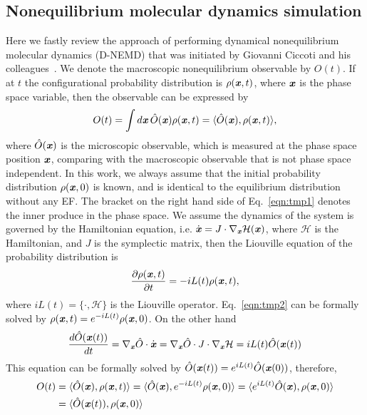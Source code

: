 \documentclass[a4paper,preprint,unsortedaddress,onecolumn]{revtex4-1}
\newcommand{\vect}[1]{\textbf{\textit{#1}}}
\begin{document}
\subsection{Nonequilibrium molecular dynamics simulation}
Here we fastly review the approach of performing dynamical nonequilibrium
molecular dynamics (D-NEMD) that was initiated by Giovanni Ciccoti and his
colleagues~\cite{ciccotti1975direct, ciccotti1979thought,
  orlandini2011hydrodynamics, orlandini2011hydrodynamics-01}.
We denote the macroscopic nonequilibrium observable by $O(t)$. If at $t$
the configurational probability distribution is $\rho(\vect x, t)$, where
$\vect x$ is the phase space variable, then the observable can be
expressed by
\begin{align}\label{eqn:tmp1}
  O(t) = \int d\vect x\, \hat O(\vect x)\rho(\vect x, t)  = \langle \hat O(\vect x), \rho(\vect x, t)\rangle,
\end{align}
where $\hat O (\vect x)$ is the microscopic observable, 
which is measured at the phase space position $\vect x$,
comparing with the macroscopic observable that is not phase space independent.
In this work, we always assume that the initial probability distribution
$\rho(\vect x, 0)$ is known, and is identical to the equilibrium distribution
without any EF.
The bracket on the right hand side of Eq.~\eqref{eqn:tmp1} denotes the inner produce in the
phase space.  We assume the dynamics of the system is governed by the
Hamiltonian equation, i.e. $\dot {\vect x} = J \cdot \nabla_{\vect x}
\mathcal H(\vect x)$, where $\mathcal H$ is the Hamiltonian, and $J$ is
the symplectic matrix, then the Liouville equation of the probability
distribution is
\begin{align}\label{eqn:tmp2}
  \frac{\partial \rho(\vect x, t)}{\partial t} = - iL(t) \rho(\vect x, t),
\end{align}
where $iL(t) = \{\cdot, \mathcal H\}$ is the Liouville operator.
Eq.~\eqref{eqn:tmp2}
can be formally solved by $\rho(\vect x, t) = e^{-iL(t)} \rho(\vect x, 0)$.
On the other hand
\begin{align}
  \frac{d \hat O(\vect x(t))}{dt} = \nabla_{\vect x}\hat O\cdot \dot{\vect x}
  = \nabla_{\vect x}\hat O\cdot J\cdot \nabla_{\vect x}\mathcal H
  = iL(t) \hat O (\vect x(t))
\end{align}
This equation can be formally solved by $\hat O(\vect x(t)) = e^{iL(t)} \hat O(\vect x(0))$, therefore,
\begin{align}\nonumber
  O(t) & = \langle \hat O(\vect x), \rho(\vect x, t)\rangle
  = \langle \hat O(\vect x), e^{-iL(t)} \rho(\vect x, 0)\rangle
  = \langle e^{iL(t)}\hat O(\vect x), \rho(\vect x, 0)\rangle\\\label{eqn:tmp4}
  &= \langle \hat O(\vect x(t)), \rho(\vect x, 0)\rangle
\end{align}
\end{document}
